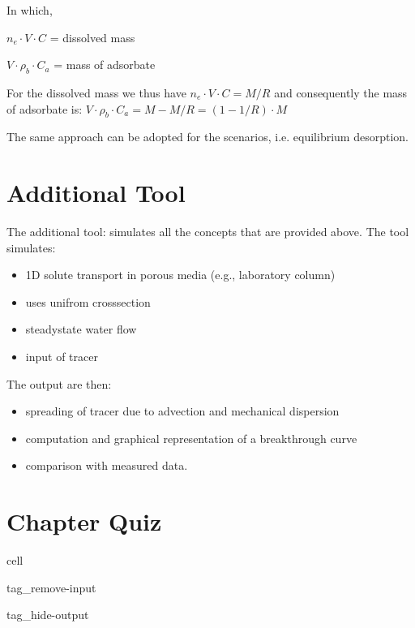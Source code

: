 \documentclass[letterpaper,10pt,english]{jupyterBook}
\begin{document}
\sphinxAtStartPar
In which,

\sphinxAtStartPar
\(n_e \cdot V \cdot C\) = dissolved mass 

\sphinxAtStartPar
\(V\cdot\rho_b \cdot C_a\) = mass of adsorbate

\sphinxAtStartPar
For the dissolved mass we thus have \(n_e \cdot V \cdot C = M/R\) and consequently the mass of adsorbate is:
\(V\cdot\rho_b \cdot C_a = M- M/R = (1-1/R)\cdot M\)

\sphinxAtStartPar
The same approach can be adopted for the  scenarios, i.e. equilibrium desorption.


\section{Additional Tool}
\label{\detokenize{content/transport/L10/22_reactive_transport:additional-tool}}
\sphinxAtStartPar
The additional tool:  simulates all the concepts that are provided above. The tool simulates:
\begin{itemize}
\item {} 
\sphinxAtStartPar
1D solute transport in porous media (e.g., laboratory column)

\item {} 
\sphinxAtStartPar
uses unifrom cross\sphinxhyphen{}section

\item {} 
\sphinxAtStartPar
steady\sphinxhyphen{}state water flow

\item {} 
\sphinxAtStartPar
input of tracer

\end{itemize}

\sphinxAtStartPar
The output are then:
\begin{itemize}
\item {} 
\sphinxAtStartPar
spreading of tracer due to advection and mechanical dispersion

\item {} 
\sphinxAtStartPar
computation and graphical representation of a breakthrough curve

\item {} 
\sphinxAtStartPar
comparison with measured data.

\end{itemize}


\section{Chapter Quiz}
\label{\detokenize{content/transport/L10/22_reactive_transport:chapter-quiz}}
\begin{sphinxuseclass}{cell}
\begin{sphinxuseclass}{tag_remove-input}
\begin{sphinxuseclass}{tag_hide-output}
\end{sphinxuseclass}
\end{sphinxuseclass}
\end{sphinxuseclass}
\sphinxstepscope
\end{document}
